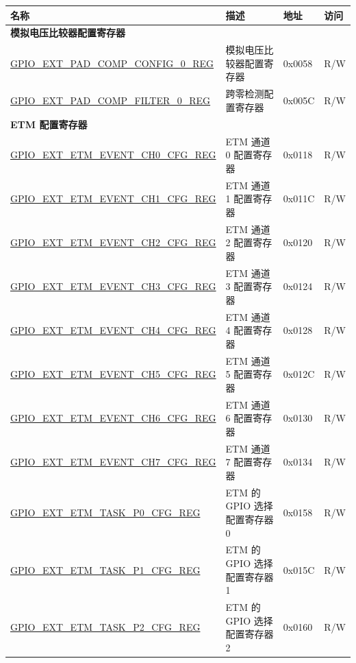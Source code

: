 \begin{longtable}{ | p{6.2cm} | p{7.0cm} | p{1.3cm} | p{1cm} | }
\hline\rowcolor{lightgray}
\textbf{名称} & \textbf{描述} &  \textbf{地址} & \textbf{访问} \\ \hline
\endhead
\multicolumn{4}{|l|}{\textbf{模拟电压比较器配置寄存器}} \\ \hline
\hyperref[regdesc:GPIOEXTPADCOMPCONFIG0REG]{GPIO\_EXT\_PAD\_COMP\_CONFIG\_0\_REG} & 模拟电压比较器配置寄存器 & 0x0058 & R/W \\ \hline
\hyperref[regdesc:GPIOEXTPADCOMPFILTER0REG]{GPIO\_EXT\_PAD\_COMP\_FILTER\_0\_REG} & 跨零检测配置寄存器 & 0x005C & R/W \\ \hline
\multicolumn{4}{|l|}{\textbf{ETM 配置寄存器}} \\ \hline
\hyperref[regdesc:GPIOEXTETMEVENTCHNCFGREG]{GPIO\_EXT\_ETM\_EVENT\_CH0\_CFG\_REG} & ETM 通道 0 配置寄存器 & 0x0118 & R/W \\ \hline
\hyperref[regdesc:GPIOEXTETMEVENTCHNCFGREG]{GPIO\_EXT\_ETM\_EVENT\_CH1\_CFG\_REG} & ETM 通道 1 配置寄存器 & 0x011C & R/W \\ \hline
\hyperref[regdesc:GPIOEXTETMEVENTCHNCFGREG]{GPIO\_EXT\_ETM\_EVENT\_CH2\_CFG\_REG} & ETM 通道 2 配置寄存器 & 0x0120 & R/W \\ \hline
\hyperref[regdesc:GPIOEXTETMEVENTCHNCFGREG]{GPIO\_EXT\_ETM\_EVENT\_CH3\_CFG\_REG} & ETM 通道 3 配置寄存器 & 0x0124 & R/W \\ \hline
\hyperref[regdesc:GPIOEXTETMEVENTCHNCFGREG]{GPIO\_EXT\_ETM\_EVENT\_CH4\_CFG\_REG} & ETM 通道 4 配置寄存器 & 0x0128 & R/W \\ \hline
\hyperref[regdesc:GPIOEXTETMEVENTCHNCFGREG]{GPIO\_EXT\_ETM\_EVENT\_CH5\_CFG\_REG} & ETM 通道 5 配置寄存器 & 0x012C & R/W \\ \hline
\hyperref[regdesc:GPIOEXTETMEVENTCHNCFGREG]{GPIO\_EXT\_ETM\_EVENT\_CH6\_CFG\_REG} & ETM 通道 6 配置寄存器 & 0x0130 & R/W \\ \hline
\hyperref[regdesc:GPIOEXTETMEVENTCHNCFGREG]{GPIO\_EXT\_ETM\_EVENT\_CH7\_CFG\_REG} & ETM 通道 7 配置寄存器 & 0x0134 & R/W \\ \hline
\hyperref[regdesc:GPIOEXTETMTASKP0CFGREG]{GPIO\_EXT\_ETM\_TASK\_P0\_CFG\_REG} & ETM 的 GPIO 选择配置寄存器 0 & 0x0158 & R/W \\ \hline
\hyperref[regdesc:GPIOEXTETMTASKP1CFGREG]{GPIO\_EXT\_ETM\_TASK\_P1\_CFG\_REG} & ETM 的 GPIO 选择配置寄存器 1 & 0x015C & R/W \\ \hline
\hyperref[regdesc:GPIOEXTETMTASKP2CFGREG]{GPIO\_EXT\_ETM\_TASK\_P2\_CFG\_REG} & ETM 的 GPIO 选择配置寄存器 2 & 0x0160 & R/W \\ \hline

\end{longtable}
